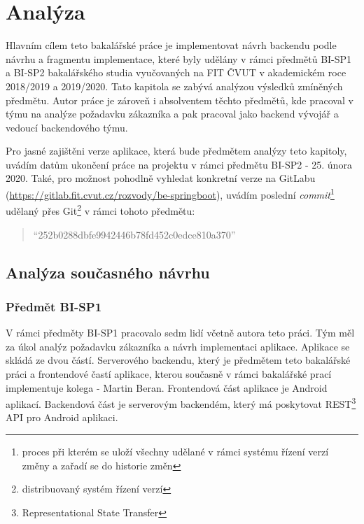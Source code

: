 \chapter{Analýza}
\label{chapter:analyza}
Hlavním cílem teto bakalářské práce je implementovat návrh backendu podle návrhu a fragmentu implementace, které byly udělány v rámci předmětů BI-SP1 a BI-SP2 bakalářského studia vyučovaných na FIT ČVUT v akademickém roce 2018/2019 a 2019/2020. Tato kapitola se zabývá analýzou výsledků zmíněných předmětu. Autor práce je zároveň i absolventem těchto předmětů, kde pracoval v týmu na analýze požadavku zákazníka a pak pracoval jako backend vývojář a vedoucí backendového týmu.

Pro jasné zajištěni verze aplikace, která bude předmětem analýzy teto kapitoly, uvádím datům ukončení práce na projektu v rámci předmětu BI-SP2 - 25. února 2020. Také, pro možnost pohodlně vyhledat konkretní verze na GitLabu (\url{https://gitlab.fit.cvut.cz/rozvody/be-springboot}), uvádím poslední \textit{commit}\footnote{proces při kterém se uloží všechny udělané v rámci systému řízení verzí změny a zařadí se do historie změn} udělaný přes Git\footnote{ distribuovaný systém řízení verzí} v rámci tohoto předmětu: 
\begin{quote}
    \enquote{252b0288dbfe9942446b78fd452c0edce810a370}
\end{quote}



\section{Analýza současného návrhu} \label{analyza:analyza navrhu}
    
    \subsection{Předmět BI-SP1}\label{analyza:navrh:sp1}
    V rámci předměty BI-SP1 pracovalo sedm lidí včetně autora teto práci. Tým měl za úkol analýz požadavku zákazníka a návrh implementaci aplikace. Aplikace se skládá ze dvou částí. Serverového backendu, který je předmětem teto bakalářské práci a frontendové častí aplikace, kterou současně v rámci bakalářské prací implementuje kolega - Martin Beran. Frontendová část aplikace je Android aplikací. Backendová část je serverovým backendém, který má poskytovat REST\footnote{Representational State Transfer} API pro Android aplikaci.
    
